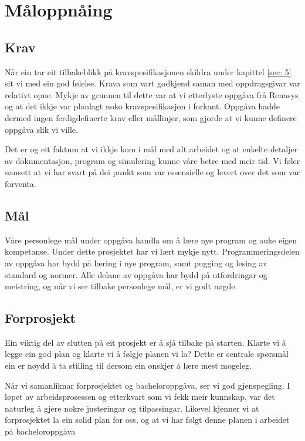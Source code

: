 \section{Måloppnåing}
\thispagestyle{fancy}

\subsection{Krav}
Når ein tar eit tilbakeblikk på kravspesifikasjonen skildra under kapittel \ref{sec: 5} sit vi med ein god følelse.
Krava som vart godkjend saman med oppdragsgivar var relativt opne.
Mykje av grunnen til dette var at vi etterlyste oppgåva frå \gls{Renasys} og at det ikkje var planlagt noko kravspesifikasjon i forkant. \newline
Oppgåva hadde dermed ingen ferdigdefinerte krav eller mållinjer, som gjorde at vi kunne definere oppgåva slik vi ville.

Det er og eit faktum at vi ikkje kom i mål med alt arbeidet og at enkelte detaljer av dokumentasjon, program og simulering
kunne våre betre med meir tid.
Vi føler uansett at vi har svart på dei punkt som var essensielle og levert over det som var forventa.



\subsection{Mål}
Våre personlege mål under oppgåva handla om å lære nye program og auke eigen kompetanse. Under dette prosjektet har vi lært mykje nytt. 
Programmeringsdelen av oppgåva har bydd på læring i nye program, samt pugging og lesing av standard og normer.
Alle delane av oppgåva har bydd på utfordringar og meistring, og når vi ser tilbake personlege mål, er vi godt nøgde.

\subsection{Forprosjekt}
Ein viktig del av slutten på eit prosjekt er å sjå tilbake på starten.
Klarte vi å legge ein god plan og klarte vi å følgje planen vi la?
Dette er sentrale spørsmål ein er nøydd å ta stilling til dersom ein ønskjer å lære mest mogeleg.

Når vi samanliknar forprosjektet og bacheloroppgåva, ser vi god gjenspegling. 
I løpet av arbeidsprosessen og etterkvart som vi fekk meir kunnskap, var det naturleg å gjere nokre justeringar og tilpassingar. 
Likevel kjenner vi at forprosjektet la ein solid plan for oss, og at vi har følgt denne planen i arbeidet på bacheloroppgåva



\newpage